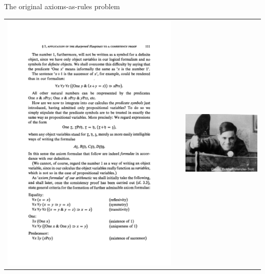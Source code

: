 \documentclass[9pt]{beamer}
\begin{document}
\begin{frame}{The original axioms-as-rules problem}
\begin{overlayarea}{\textwidth}{7cm}
{\begin{tabular}{lcl}
\includegraphics[scale=0.5]{figs/gentzen1} &\qquad& \includegraphics[scale=0.3]{figs/gentzen3}\\

\end{tabular}}
\end{overlayarea}
\end{frame}
\end{document}
